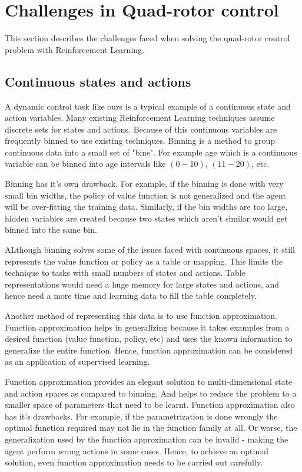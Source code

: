 \documentclass[hidelinks,BTech]{iitmdiss}
\begin{document}
\section{Challenges in Quad-rotor control}

This section describes the challenges faced when solving the quad-rotor control problem with Reinforcement Learning.

\subsection{Continuous states and actions}

A dynamic control task like ours is a typical example of a continuous state and action variables. Many existing Reinforcement Learning techniques assume discrete sets for states and actions. Because of this continuous variables are frequently binned to use existing techniques. Binning is a method to group continuous data into a small set of "bins". For example age which is a continuous variable can be binned into age intervals like $(0-10)$, $(11-20)$, etc.

Binning has it's own drawback. For example, if the binning is done with very small bin widths, the policy of value function is not generalized and the agent will be over-fitting the training data. Similarly, if the bin widths are too large, hidden variables are created because two states which aren't similar would get binned into the same bin.

ALthough binning solves some of the issues faced with continuous spaces, it still represents the value function or policy as a table or mapping. This limits the technique to tasks with small numbers of states and actions. Table representations would need a huge memory for large states and actions, and hence need a more time and learning data to fill the table completely.

Another method of representing this data is to use function approximation. Function approximation helps in generalizing because it takes examples from a desired function (value function, policy, etc) and uses the known information to generalize the entire function. Hence, function approximation can be considered as an application of supervised learning.

Function approximation provides an elegant solution to multi-dimensional state and action spaces as compared to binning. And helps to reduce the problem to a smaller space of parameters that need to be learnt. Function approximation also has it's drawbacks. For example, if the parametrization is done wrongly the optimal function required may not lie in the function family at all. Or worse, the generalization used by the function approximation can be invalid - making the agent perform wrong actions in some cases. Hence, to achieve an optimal solution, even function approximation needs to be carried out carefully.
\end{document}
